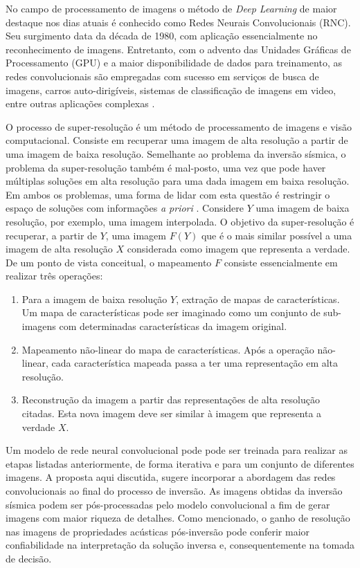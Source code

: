 No campo de
processamento de imagens o método de \textit{Deep Learning} de
maior destaque nos dias atuais é conhecido
como Redes Neurais Convolucionais (RNC). Seu surgimento
data da década de 1980, com aplicação essencialmente no reconhecimento de imagens.
Entretanto, com o advento das Unidades Gráficas de Processamento (GPU) e a maior
disponibilidade de dados para treinamento, as redes convolucionais
são empregadas com sucesso em serviços de busca de imagens, carros auto-dirigíveis,
sistemas de classificação de imagens em video, entre outras aplicações complexas \citep[p. 50]{Buduma15}.

O processo de super-resolução é um método de processamento de imagens e visão computacional.
Consiste em recuperar uma imagem de alta resolução a partir de uma imagem
de baixa resolução. Semelhante ao problema da inversão sísmica, o problema da super-resolução
também é mal-posto, uma vez que pode haver múltiplas soluções em alta resolução para uma dada imagem em baixa
resolução. Em ambos os problemas, uma forma de lidar com esta questão é restringir o espaço
de soluções com informações \textit{a priori} \citep{DongLoy14}. 
Considere $Y$ uma imagem de baixa resolução, por exemplo, uma
imagem interpolada. O objetivo da super-resolução é
recuperar, a partir de $Y$, uma imagem $F(Y)$ que é
o mais similar possível a uma imagem de alta resolução $X$
considerada como imagem que representa a verdade.
De um ponto de vista conceitual, o mapeamento $F$ consiste essencialmente em
realizar três operações:
\begin{enumerate}
 \item Para a imagem de baixa resolução $Y$, extração de mapas de características. Um mapa de características
 pode ser imaginado como um conjunto de sub-imagens com determinadas características da imagem original.
 \item Mapeamento não-linear do mapa de características. Após a operação não-linear, cada característica mapeada
 passa a ter uma representação em alta resolução.
 \item Reconstrução da imagem a partir das representações de alta resolução citadas. Esta nova imagem
 deve ser similar à imagem que representa a verdade $X$.
\end{enumerate}

Um modelo de rede neural convolucional pode pode ser treinada para realizar as etapas listadas anteriormente,
de forma iterativa e para um conjunto de diferentes imagens.
A proposta aqui discutida, sugere incorporar a abordagem das redes convolucionais ao final do processo de inversão.
As imagens obtidas da inversão sísmica podem ser pós-processadas pelo modelo convolucional
a fim de gerar imagens com maior riqueza de detalhes. Como mencionado, o ganho de resolução
nas imagens de propriedades acústicas pós-inversão pode conferir maior confiabilidade
na interpretação da solução inversa e, consequentemente na tomada de decisão.

